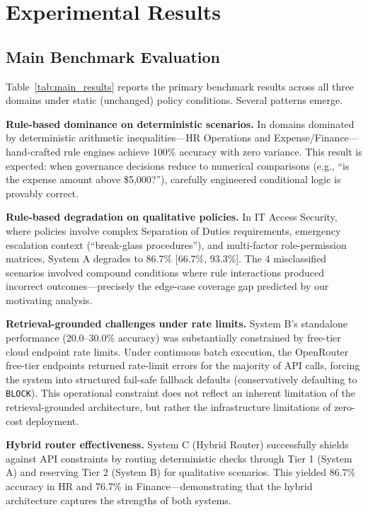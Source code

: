 \documentclass[sigconf,screen]{acmart}
\begin{document}
\section{Experimental Results}

\subsection{Main Benchmark Evaluation}
Table~\ref{tab:main_results} reports the primary benchmark results across all three domains under static (unchanged) policy conditions. Several patterns emerge.

\noindent\textbf{Rule-based dominance on deterministic scenarios.} In domains dominated by deterministic arithmetic inequalities---HR Operations and Expense/Finance---hand-crafted rule engines achieve 100\% accuracy with zero variance. This result is expected: when governance decisions reduce to numerical comparisons (e.g., ``is the expense amount above \$5,000?''), carefully engineered conditional logic is provably correct.

\noindent\textbf{Rule-based degradation on qualitative policies.} In IT Access Security, where policies involve complex Separation of Duties requirements, emergency escalation context (``break-glass procedures''), and multi-factor role-permission matrices, System A degrades to 86.7\% [66.7\%, 93.3\%]. The 4 misclassified scenarios involved compound conditions where rule interactions produced incorrect outcomes---precisely the edge-case coverage gap predicted by our motivating analysis.

\noindent\textbf{Retrieval-grounded challenges under rate limits.} System B's standalone performance (20.0--30.0\% accuracy) was substantially constrained by free-tier cloud endpoint rate limits. Under continuous batch execution, the OpenRouter free-tier endpoints returned rate-limit errors for the majority of API calls, forcing the system into structured fail-safe fallback defaults (conservatively defaulting to \texttt{BLOCK}). This operational constraint does not reflect an inherent limitation of the retrieval-grounded architecture, but rather the infrastructure limitations of zero-cost deployment.

\noindent\textbf{Hybrid router effectiveness.} System C (Hybrid Router) successfully shields against API constraints by routing deterministic checks through Tier 1 (System A) and reserving Tier 2 (System B) for qualitative scenarios. This yielded 86.7\% accuracy in HR and 76.7\% in Finance---demonstrating that the hybrid architecture captures the strengths of both systems.
\end{document}
